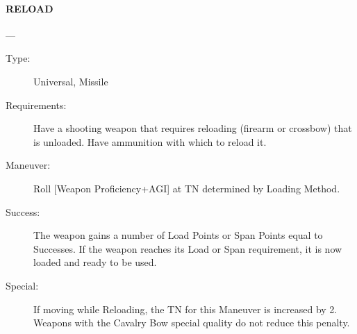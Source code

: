 \documentclass[oneside,11pt,english]{book}
\begin{document}
\paragraph{\large\label{man:RELOAD} RELOAD}---\quad{\large[???????]}
\vspace{-10pt}\begin{description} 
\item [Type:] Universal, Missile 
\item [Requirements:] Have a shooting weapon that requires reloading (firearm or crossbow) that is unloaded. 
Have ammunition with which to reload it. 
\item [Maneuver:] Roll [Weapon Proficiency+AGI] at TN determined by Loading Method. 
\item [Success:] The weapon gains a number of Load Points or Span Points equal to Successes. If the weapon 
reaches its Load or Span requirement, it is now loaded and ready to be used. 
\item [Special:] If moving while Reloading, the TN for this Maneuver is increased by 2. Weapons with the 
Cavalry Bow special quality do not reduce this penalty. 
\end{description}
\end{document}
